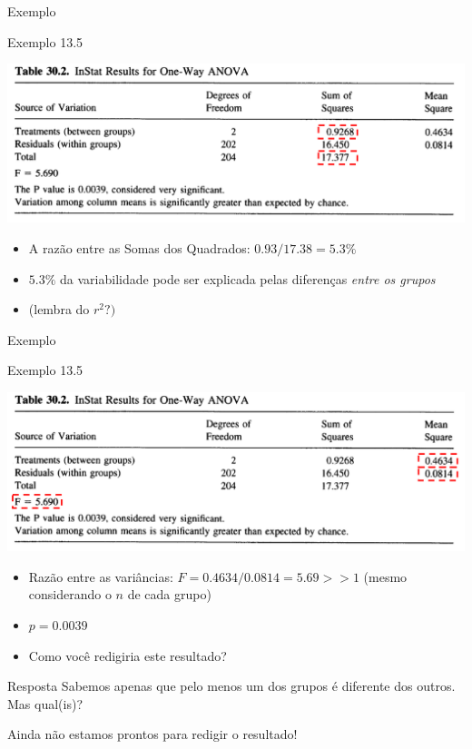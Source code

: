 \documentclass{beamer}
\begin{document}
\begin{frame}{Exemplo}
  \begin{exampleblock}{Exemplo 13.5}
    \begin{center}
      \includegraphics[width=.6\textwidth]{Topicos_adv/exemplo13_5-2}
    \end{center}
  \begin{itemize}
  \item A razão entre as Somas dos Quadrados: $0.93/17.38 = 5.3\%$
  \item $5.3\%$ da variabilidade pode ser explicada pelas diferenças {\em entre os grupos}
  \item (lembra do $r^2?)$
  \end{itemize}
  \end{exampleblock}
\end{frame}

\begin{frame}{Exemplo}
  \begin{exampleblock}{Exemplo 13.5}
    \begin{center}
      \includegraphics[width=.6\textwidth]{Topicos_adv/exemplo13_5-3}
    \end{center}
  \begin{itemize}
  \item Razão entre as variâncias: $F = 0.4634/0.0814 = 5.69 >> 1$ {\tiny (mesmo considerando o $n$ de cada grupo)}
  \item $p=0.0039$
  \item Como você redigiria este resultado?
  \end{itemize}
  \end{exampleblock}
\end{frame}

\begin{frame}{}
  \begin{block}{Resposta}
    Sabemos apenas que pelo menos um dos grupos é diferente dos outros.
    Mas qual(is)?

    \bigskip
    Ainda não estamos prontos para redigir o resultado!
  \end{block}
\end{frame}
\end{document}
